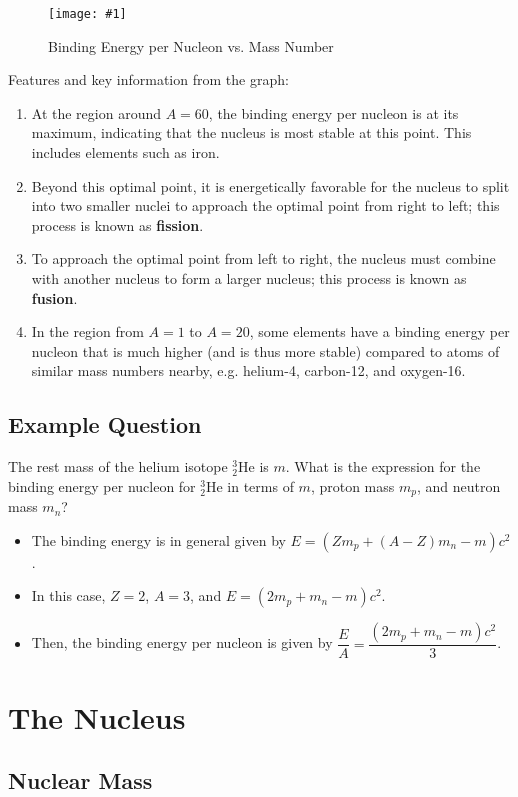 \documentclass[a4paper,12pt]{article}
\let\oldsection\section
\renewcommand\section{\clearpage\oldsection}
\newcommand{\img}[4]{\begin{center}
  \begin{figure}[H]
    \centering
    \texttt{[image: \#1]}
    \caption{#3}
    \label{fig:#4}
  \end{figure}
\end{center}}
\newcommand{\atom}[3]{{}^{#1}_{#2}\text{#3}}
\begin{document}
\img{BE_A plot.png}{0.8}{Binding Energy per Nucleon vs. Mass Number}{BE_A}

Features and key information from the graph:
\begin{enumerate}
  \item At the region around $A = 60$, the binding energy per nucleon is at its maximum, indicating that the nucleus is most stable at this point. This includes elements such as iron.
  \item Beyond this optimal point, it is energetically favorable for the nucleus to split into two smaller nuclei to approach the optimal point from right to left; this process is known as \textbf{fission}.
  \item To approach the optimal point from left to right, the nucleus must combine with another nucleus to form a larger nucleus; this process is known as \textbf{fusion}.
  \item In the region from $A = 1$ to $A = 20$, some elements have a binding energy per nucleon that is much higher (and is thus more stable) compared to atoms of similar mass numbers nearby, e.g. helium-4, carbon-12, and oxygen-16.
\end{enumerate}

\subsection{Example Question}
The rest mass of the helium isotope $\atom{3}{2}{He}$ is $m$. What is the expression for the binding energy per nucleon for $\atom{3}{2}{He}$ in terms of $m$, proton mass $m_p$, and neutron mass $m_n$?
\begin{itemize}
  \item The binding energy is in general given by $E = (Zm_p + (A-Z)m_n - m)c^2$.
  \item In this case, $Z = 2$, $A = 3$, and $E = (2m_p + m_n - m)c^2$.
  \item Then, the binding energy per nucleon is given by $\dfrac{E}{A} = \dfrac{(2m_p + m_n - m)c^2}{3}$.
\end{itemize}

\section{The Nucleus}

\subsection{Nuclear Mass}
\end{document}
